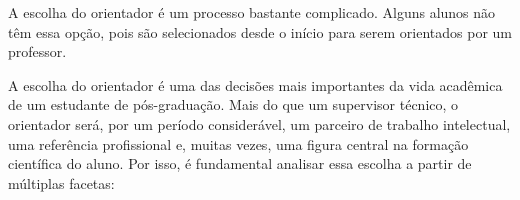 A escolha do orientador é um processo bastante complicado. Alguns alunos não têm essa opção, pois são selecionados desde o início para serem orientados por um professor. 



A escolha do orientador é uma das decisões mais importantes da vida acadêmica de um estudante de pós-graduação. Mais do que um supervisor técnico, o orientador será, por um período considerável, um parceiro de trabalho intelectual, uma referência profissional e, muitas vezes, uma figura central na formação científica do aluno. Por isso, é fundamental analisar essa escolha a partir de múltiplas facetas:

